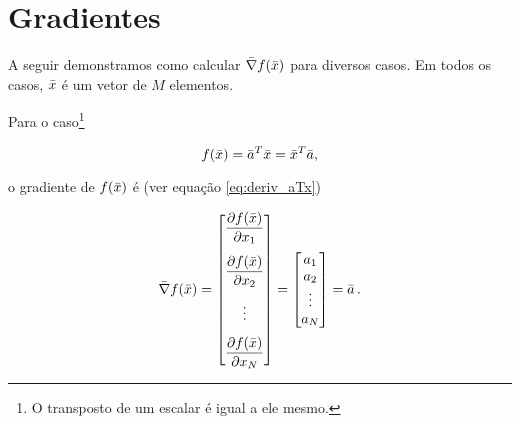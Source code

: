 \section{Gradientes}

A seguir demonstramos como calcular $\bar{\nabla}f(\bar{x})$
para diversos casos.
Em todos os casos, $\bar{x}$ é um vetor de $M$ elementos.

\begin{example}
    Para o caso\footnote{O transposto de um escalar é igual a ele mesmo.}

    \begin{equation}
    f(\bar{x}) = \bar{a}^T\bar{x} = \bar{x}^T\bar{a},
    \end{equation}
    
    \noindent o gradiente de $f(\bar{x})$ é (ver equação \ref{eq:deriv_aTx})
    
    \begin{equation}
    \vect{\nabla}f(\vect{x}) =
    \begin{bmatrix}
    \dfrac{\partial f(\vect{x})}{\partial x_1} \vspace{0.3cm}\\
    \dfrac{\partial f(\vect{x})}{\partial x_2} \vspace{0.3cm}\\
    \vdots \vspace{0.3cm}\\
    \dfrac{\partial f(\vect{x})}{\partial x_N}
    \end{bmatrix}
    =
    \begin{bmatrix}
    a_1 \\ a_2 \\ \vdots \\ a_N
    \end{bmatrix}
    = \vect{a}
    \thinspace .
    \end{equation}
\end{example}

